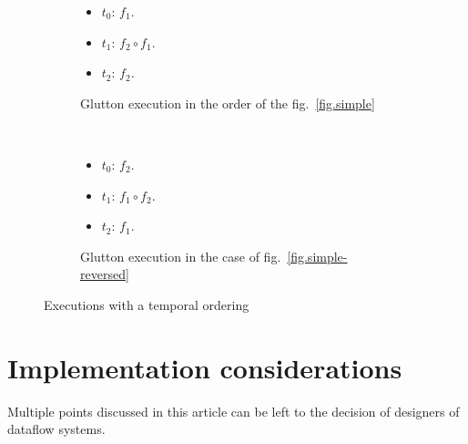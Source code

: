 \documentclass{article}
\begin{document}
\begin{figure}[h]
  \begin{subfigure}{0.20\textwidth}
    \begin{itemize}
      \item $t_0$: $f_1$.
      \item $t_1$: $f_2 \circ f_1$.
      \item $t_2$: $f_2$. 
    \end{itemize}
    \caption{Glutton execution in the order of the fig.~\ref{fig.simple}}
  \end{subfigure}~
  \begin{subfigure}{0.20\textwidth}
    \begin{itemize}
      \item $t_0$: $f_2$.
      \item $t_1$: $f_1 \circ f_2$.
      \item $t_2$: $f_1$. 
    \end{itemize}
    \caption{Glutton execution in the case of fig.~\ref{fig.simple-reversed}}
  \end{subfigure}
  \caption{Executions with a temporal ordering}
  \label{fig.temporalordering}
\end{figure}
    
    
    

\section{Implementation considerations}
Multiple points discussed in this article can be left to the decision of designers of dataflow systems.

\end{document}
